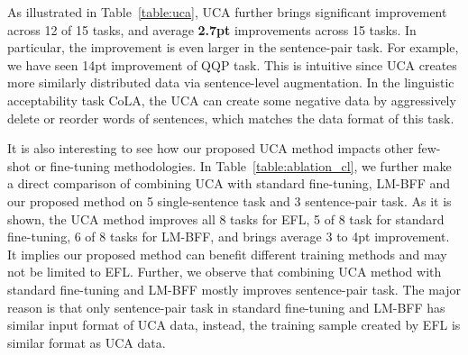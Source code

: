 \documentclass{article}
\begin{document}
\begin{table*}[h]
\renewcommand{\arraystretch}{1.1}
\caption{Results of combining unsupervised contrastive data augmentation (UCA) with different methods. We report average  across 5 different training sets. Note that bold numbers refer to the new best results achieved compared to results in Table~\ref{table:few_shot_16_1} and Table~\ref{table:few_shot_16_2}.}
\label{table:ablation_cl}
\end{table*}
As illustrated in Table~\ref{table:uca}, UCA further brings significant improvement across 12 of 15 tasks, and average \textbf{2.7pt} improvements across 15 tasks. In particular, the improvement is even larger in the sentence-pair task. For example, we have seen 14pt improvement of QQP task. This is intuitive since UCA creates more similarly distributed data via sentence-level augmentation. In the linguistic acceptability task CoLA, the UCA can create some negative data by aggressively delete or reorder words of sentences, which matches the data format of this task.

It is also interesting to see how our proposed UCA method impacts other few-shot or fine-tuning methodologies. In Table~\ref{table:ablation_cl}, we further make a direct comparison of combining UCA with standard fine-tuning, LM-BFF and our proposed method on 5 single-sentence task and 3 sentence-pair task. As it is shown, the UCA method improves all 8 tasks for EFL, 5 of 8 task for standard fine-tuning, 6 of 8 tasks for LM-BFF, and brings average 3 to 4pt improvement. It implies our proposed method can benefit different training methods and may not be limited to EFL. Further, we observe that combining UCA method with standard fine-tuning and LM-BFF mostly improves sentence-pair task. The major reason is that only sentence-pair task in standard fine-tuning and LM-BFF has similar input format of UCA data, instead, the training sample created by EFL is similar format as UCA data.
\end{document}
